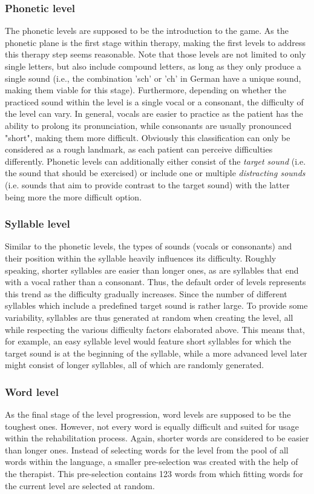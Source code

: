 \documentclass[draft,final]{vutinfth} %
\begin{document}
\subsubsection{Phonetic level}
The phonetic levels are supposed to be the introduction to the game. As the phonetic plane is the first stage within therapy, making the first levels to address this therapy step seems reasonable. Note that those levels are not limited to only single letters, but also include compound letters, as long as they only produce a single sound (i.e., the combination 'sch' or 'ch' in German have a unique sound, making them viable for this stage). Furthermore, depending on whether the practiced sound within the level is a single vocal or a consonant, the difficulty of the level can vary. In general, vocals are easier to practice as the patient has the ability to prolong its pronunciation, while consonants are usually pronounced "short", making them more difficult. Obviously this classification can only be considered as a rough landmark, as each patient can perceive difficulties differently. Phonetic levels can additionally either consist of the \emph{target sound} (i.e. the sound that should be exercised) or include one or multiple \emph{distracting sounds} (i.e. sounds that aim to provide contrast to the target sound) with the latter being more the more difficult option.

\subsubsection{Syllable level}
Similar to the phonetic levels, the types of sounds (vocals or consonants) and their position within the syllable heavily influences its difficulty. Roughly speaking, shorter syllables are easier than longer ones, as are syllables that end with a vocal rather than a consonant. Thus, the default order of levels represents this trend as the difficulty gradually increases. Since the number of different syllables which include a predefined target sound is rather large. To provide some variability, syllables are thus generated at random when creating the level, all while respecting the various difficulty factors elaborated above. This means that, for example, an easy syllable level would feature short syllables for which the target sound is at the beginning of the syllable, while a more advanced level later might consist of longer syllables, all of which are randomly generated.

\subsubsection{Word level}
As the final stage of the level progression, word levels are supposed to be the toughest ones. However, not every word is equally difficult and suited for usage within the rehabilitation process. Again, shorter words are considered to be easier than longer ones. Instead of selecting words for the level from the pool of all words within the language, a smaller pre-selection was created with the help of the therapist. This pre-selection contains 123 words from which fitting words for the current level are selected at random. \\
\end{document}
